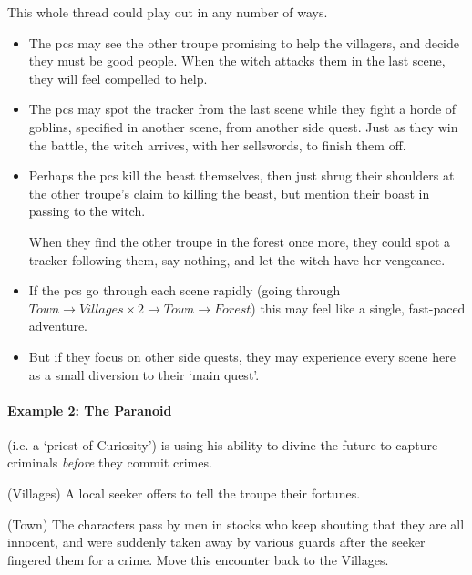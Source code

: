 \begin{multicols}{2}

\noindent
This whole thread could play out in any number of ways.

\begin{itemize}
  \item
  The \glspl{pc} may see the other troupe promising to help the villagers, and decide they must be good people.
  When the witch attacks them in the last scene, they will feel compelled to help.
  \item
  The \glspl{pc} may spot the tracker from the last scene while they fight a horde of goblins, specified in another scene, from another side quest.
  Just as they win the battle, the witch arrives, with her sellswords, to finish them off.
  \item
  Perhaps the \glspl{pc} kill the beast themselves, then just shrug their shoulders at the other troupe's claim to killing the beast, but mention their boast in passing to the witch.

  When they find the other troupe in the forest once more, they could spot a tracker following them, say nothing, and let the witch have her vengeance.
  \item
  If the \glspl{pc} go through each scene rapidly (going through $Town \rightarrow Villages \times 2 \rightarrow Town \rightarrow Forest$) this may feel like a single, fast-paced adventure.
  \item
  But if they focus on other side quests, they may experience every scene here as a small diversion to their `main quest'.
\end{itemize}

\paragraph{Example 2: The Paranoid }

\begin{exampletext}

 (i.e. a `priest of Curiosity') is using his ability to divine the future to capture criminals \emph{before} they commit crimes.

\begin{list}{\sqn}{}

  \item[\sqr\squash]
  (Villages) A local \gls{seeker} offers to tell the troupe their fortunes.

  \item
  (Town) The characters pass by men in stocks who keep shouting that they are all innocent, and were suddenly taken away by various guards after the \gls{seeker} fingered them for a crime.
  Move this encounter back to the Villages.


\end{list}
\end{exampletext}
\end{multicols}
